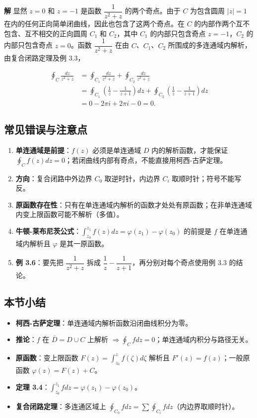 \textbf{解} 显然 \(z=0\) 和 \(z=-1\) 是函数 \(\dfrac{1}{z^2+z}\)
的两个奇点。由于 \(C\) 为包含圆周 \(|z|=1\)
在内的任何正向简单闭曲线，因此也包含了这两个奇点。在 \(C\)
的内部作两个互不包含、互不相交的正向圆周 \(C_1\) 和 \(C_2\)，其中
\(C_1\) 的内部只包含奇点 \(z=-1\)，\(C_2\) 的内部只包含奇点
\(z=0\)。函数 \(\dfrac{1}{z^2+z}\) 在由 \(C\)、\(C_1\)、\(C_2\)
所围成的多连通域内解析，由复合闭路定理及例 3.3，

\[
\begin{aligned}
\oint_C\frac{dz}{z^2+z}
&=\oint_{C_1}\frac{dz}{z^2+z}+\oint_{C_2}\frac{dz}{z^2+z}\\
&=\oint_{C_1}\left(\frac{1}{z}-\frac{1}{z+1}\right)dz
+\oint_{C_2}\left(\frac{1}{z}-\frac{1}{z+1}\right)dz\\
&=0-2\pi i+2\pi i-0=0 .
\end{aligned}
\]

\subsection{常见错误与注意点}\label{ux5e38ux89c1ux9519ux8befux4e0eux6ce8ux610fux70b9-8}

\begin{enumerate}
\def\labelenumi{\arabic{enumi}.}
\tightlist
\item
  \textbf{单连通域是前提}：\(f(z)\) 必须是单连通域 \(D\)
  内的解析函数，才能保证
  \(\oint_C f(z)dz=0\)；若闭曲线内部有奇点，不能直接用柯西-古萨定理。
\item
  \textbf{方向}：复合闭路中外边界 \(C_0\) 取逆时针，内边界 \(C_i\)
  取顺时针；符号不能写反。
\item
  \textbf{原函数存在性}：只有在单连通域内解析的函数才处处有原函数；在非单连通域内变上限函数可能不解析（多值）。
\item
  \textbf{牛顿-莱布尼茨公式}：\(\int_{z_0}^{z_1}f(z)dz=\varphi(z_1)-\varphi(z_0)\)
  的前提是 \(f\) 在单连通域内解析且 \(\varphi\) 是其一原函数。
\item
  \textbf{例 3.6}：要先把 \(\dfrac{1}{z^2+z}\) 拆成
  \(\dfrac1z-\dfrac1{z+1}\)，再分别对每个奇点使用例 3.3 的结论。
\end{enumerate}

\subsection{本节小结}\label{ux672cux8282ux5c0fux7ed3-8}

\begin{itemize}
\tightlist
\item
  \textbf{柯西-古萨定理}：单连通域内解析函数沿闭曲线积分为零。
\item
  \textbf{推论}：\(f\) 在 \(\bar D=D\cup C\) 上解析
  \(\Rightarrow\oint_C fdz=0\)；单连通域内积分与路径无关。
\item
  \textbf{原函数}：变上限函数 \(F(z)=\int_{z_0}^z f(\zeta)d\zeta\)
  解析且 \(F'(z)=f(z)\)；一般原函数 \(\varphi(z)=F(z)+C\)。
\item
  \textbf{定理 3.4}：\(\int_{z_0}^{z_1}fdz=\varphi(z_1)-\varphi(z_0)\)。
\item
  \textbf{复合闭路定理}：多连通区域上
  \(\oint_{C_0}fdz=\sum\oint_{C_i}fdz\)（内边界取顺时针）。
\end{itemize}

